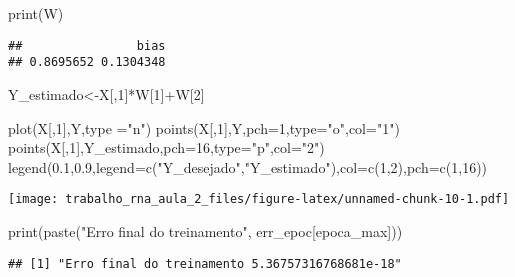 \documentclass[
]{article}
\newenvironment{Shaded}{\begin{snugshade}}{\end{snugshade}}
\newcommand{\AttributeTok}[1]{\textcolor[rgb]{0.77,0.63,0.00}{#1}}
\newcommand{\DecValTok}[1]{\textcolor[rgb]{0.00,0.00,0.81}{#1}}
\newcommand{\FloatTok}[1]{\textcolor[rgb]{0.00,0.00,0.81}{#1}}
\newcommand{\FunctionTok}[1]{\textcolor[rgb]{0.00,0.00,0.00}{#1}}
\newcommand{\NormalTok}[1]{#1}
\newcommand{\OtherTok}[1]{\textcolor[rgb]{0.56,0.35,0.01}{#1}}
\newcommand{\SpecialCharTok}[1]{\textcolor[rgb]{0.00,0.00,0.00}{#1}}
\newcommand{\StringTok}[1]{\textcolor[rgb]{0.31,0.60,0.02}{#1}}
\begin{document}
\begin{Shaded}
\begin{Highlighting}[]
\FunctionTok{print}\NormalTok{(W)}
\end{Highlighting}
\end{Shaded}

\begin{verbatim}
##                bias 
## 0.8695652 0.1304348
\end{verbatim}

\begin{Shaded}
\begin{Highlighting}[]
\NormalTok{Y\_estimado}\OtherTok{\textless{}{-}}\NormalTok{X[,}\DecValTok{1}\NormalTok{]}\SpecialCharTok{*}\NormalTok{W[}\DecValTok{1}\NormalTok{]}\SpecialCharTok{+}\NormalTok{W[}\DecValTok{2}\NormalTok{]}

\FunctionTok{plot}\NormalTok{(X[,}\DecValTok{1}\NormalTok{],Y,}\AttributeTok{type =}\StringTok{"n"}\NormalTok{)}
\FunctionTok{points}\NormalTok{(X[,}\DecValTok{1}\NormalTok{],Y,}\AttributeTok{pch=}\DecValTok{1}\NormalTok{,}\AttributeTok{type=}\StringTok{"o"}\NormalTok{,}\AttributeTok{col=}\StringTok{"1"}\NormalTok{)}
\FunctionTok{points}\NormalTok{(X[,}\DecValTok{1}\NormalTok{],Y\_estimado,}\AttributeTok{pch=}\DecValTok{16}\NormalTok{,}\AttributeTok{type=}\StringTok{"p"}\NormalTok{,}\AttributeTok{col=}\StringTok{"2"}\NormalTok{)}
\FunctionTok{legend}\NormalTok{(}\FloatTok{0.1}\NormalTok{,}\FloatTok{0.9}\NormalTok{,}\AttributeTok{legend=}\FunctionTok{c}\NormalTok{(}\StringTok{"Y\_desejado"}\NormalTok{,}\StringTok{"Y\_estimado"}\NormalTok{),}\AttributeTok{col=}\FunctionTok{c}\NormalTok{(}\DecValTok{1}\NormalTok{,}\DecValTok{2}\NormalTok{),}\AttributeTok{pch=}\FunctionTok{c}\NormalTok{(}\DecValTok{1}\NormalTok{,}\DecValTok{16}\NormalTok{))}
\end{Highlighting}
\end{Shaded}

\texttt{[image: trabalho\_rna\_aula\_2\_files/figure-latex/unnamed-chunk-10-1.pdf]}

\begin{Shaded}
\begin{Highlighting}[]
\FunctionTok{print}\NormalTok{(}\FunctionTok{paste}\NormalTok{(}\StringTok{"Erro final do treinamento"}\NormalTok{, err\_epoc[epoca\_max]))}
\end{Highlighting}
\end{Shaded}

\begin{verbatim}
## [1] "Erro final do treinamento 5.36757316768681e-18"
\end{verbatim}
\end{document}
